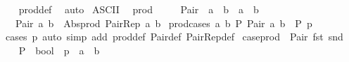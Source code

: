 \begin{isabellebody}
%
\isadelimproof
\ \ %
\endisadelimproof
%
\isatagproof
{}\isamarkupfalse%
\ prod{\isacharunderscore}{\kern0pt}def\ \isamarkupfalse%
\ auto%
\endisatagproof
{\isafoldproof}%
%
\isadelimproof
\isanewline
%
\endisadelimproof
\isanewline
{}\isamarkupfalse%
\ {\isacharparenleft}{\kern0pt}ASCII{\isacharparenright}{\kern0pt}\isanewline
\ \ prod\ \ {\isacharparenleft}{\kern0pt}\ {\isachardoublequoteopen}{\isacharasterisk}{\kern0pt}{\isachardoublequoteclose}\ {}{}{\isacharparenright}{\kern0pt}\isanewline
\isanewline
{}\isamarkupfalse%
\ Pair\ {\isacharcolon}{\kern0pt}{\isacharcolon}{\kern0pt}\ {\isachardoublequoteopen}{\isacharprime}{\kern0pt}a\ {\isasymRightarrow}\ {\isacharprime}{\kern0pt}b\ {\isasymRightarrow}\ {\isacharprime}{\kern0pt}a\ {\isasymtimes}\ {\isacharprime}{\kern0pt}b{\isachardoublequoteclose}\isanewline
\ \ \ {\isachardoublequoteopen}Pair\ a\ b\ {\isacharequal}{\kern0pt}\ Abs{\isacharunderscore}{\kern0pt}prod\ {\isacharparenleft}{\kern0pt}Pair{\isacharunderscore}{\kern0pt}Rep\ a\ b{\isacharparenright}{\kern0pt}{\isachardoublequoteclose}\isanewline
\isanewline
{}\isamarkupfalse%
\ prod{\isacharunderscore}{\kern0pt}cases{\isacharcolon}{\kern0pt}\ {\isachardoublequoteopen}{\isacharparenleft}{\kern0pt}{\isasymAnd}a\ b{\isachardot}{\kern0pt}\ P\ {\isacharparenleft}{\kern0pt}Pair\ a\ b{\isacharparenright}{\kern0pt}{\isacharparenright}{\kern0pt}\ {\isasymLongrightarrow}\ P\ p{\isachardoublequoteclose}\isanewline
%
\isadelimproof
\ \ %
\endisadelimproof
%
\isatagproof
{}\isamarkupfalse%
\ {\isacharparenleft}{\kern0pt}cases\ p{\isacharparenright}{\kern0pt}\ {\isacharparenleft}{\kern0pt}auto\ simp\ add{\isacharcolon}{\kern0pt}\ prod{\isacharunderscore}{\kern0pt}def\ Pair{\isacharunderscore}{\kern0pt}def\ Pair{\isacharunderscore}{\kern0pt}Rep{\isacharunderscore}{\kern0pt}def{\isacharparenright}{\kern0pt}%
\endisatagproof
{\isafoldproof}%
%
\isadelimproof
\isanewline
%
\endisadelimproof
\isanewline
{}\isamarkupfalse%
\ case{\isacharunderscore}{\kern0pt}prod\ \ Pair\ fst\ snd\isanewline
%
\isadelimproof
%
\endisadelimproof
%
\isatagproof
{}\isamarkupfalse%
\ {\isacharminus}{\kern0pt}\isanewline
\ \ \isamarkupfalse%
\ P\ {\isacharcolon}{\kern0pt}{\isacharcolon}{\kern0pt}\ bool\ \ p\ {\isacharcolon}{\kern0pt}{\isacharcolon}{\kern0pt}\ {\isachardoublequoteopen}{\isacharprime}{\kern0pt}a\ {\isasymtimes}\ {\isacharprime}{\kern0pt}b{\isachardoublequoteclose}\isanewline

\end{isabellebody}

